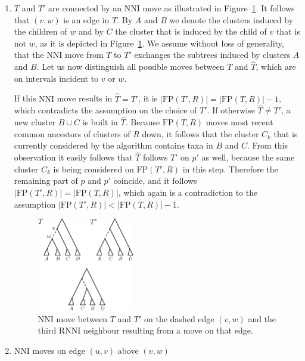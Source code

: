 \documentclass{amsart}
\newcommand{\rnni}{\mathrm{RNNI}}
\newcommand{\nni}{\mathrm{NNI}}
\newcommand{\fp}{\mathrm{FP}}
\begin{document}
\begin{enumerate}[{Case} (1).]
\item $T$ and $T'$ are connected by an $\nni$ move as illustrated in Figure~\ref{fig:thm_fp_nni1}.
It follows that $(v,w)$ is an edge in $T$.
By $A$ and $B$ we denote the clusters induced by the children of $w$ and by $C$ the cluster that is induced by the child of $v$ that is not $w$, as it is depicted in Figure~\ref{fig:thm_fp_nni1}.
We assume without loss of generality, that the $\nni$ move from $T$ to $T'$ exchanges the subtrees induced by clusters $A$ and $B$.
Let us now distinguish all possible moves between $T$ and $\hat T$, which are on intervals incident to $v$ or $w$.


If this $\nni$ move results in $\hat T = T'$, it is $|\fp(T',R)| = |\fp(T,R)| - 1$, which contradicts the assumption on the choice of $T'$.
If otherwise $\hat T \neq T'$, a new cluster $B \cup C$ is built in $\hat T$.
Because $\fp(T,R)$ moves most recent common ancestors of clusters of $R$ down, it follows that the cluster $C_k$ that is currently considered by the algorithm contains taxa in $B$ and $C$.
From this observation it easily follows that $\hat T$ follows $T'$ on $p'$ as well, because the same cluster $C_k$ is being considered on $\fp(T',R)$ in this step.
Therefore the remaining part of $p$ and $p'$ coincide, and it follows $|\fp(T',R)| = |\fp(T,R)|$, which again is a contradiction to the assumption $|\fp(T',R)| < |\fp(T,R)| - 1$.

\begin{figure}[!hbt]
\centering
\includegraphics[width=0.4\textwidth]{thm_fp_nni1}
\vspace{12pt}
\caption{$\nni$ move between $T$ and $T'$ on the dashed edge $(v,w)$ and the third $\rnni$ neighbour resulting from a move on that edge.}
\label{fig:thm_fp_nni1}
\end{figure}

\item $\nni$ moves on edge $(u,v)$ above $(v,w)$


\end{enumerate}
\end{document}
